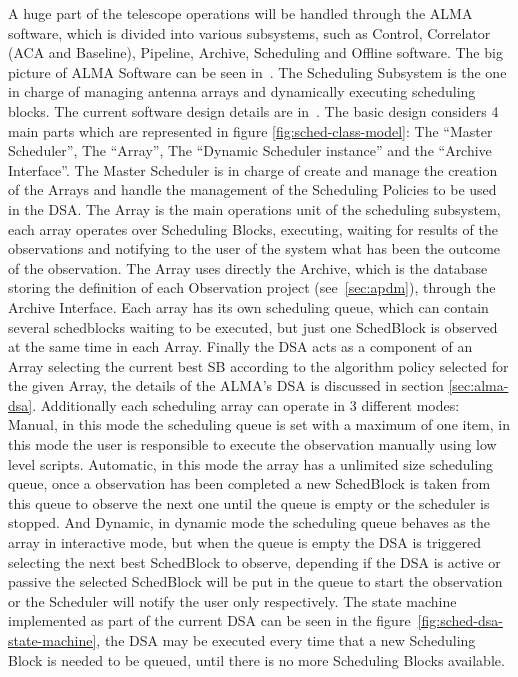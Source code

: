 A huge part of the telescope operations will be handled through the ALMA software, which is divided into various subsystems, such as Control, Correlator (ACA and Baseline), Pipeline, Archive, Scheduling and Offline software. The big picture of ALMA Software can be seen in~\cite{schwarz04}.
The Scheduling Subsystem is the one in charge of managing antenna arrays and dynamically executing scheduling blocks. The current software design details are in~\cite{clarke12}. The basic design considers 4 main parts which are represented in figure \ref{fig:sched-class-model}: The ``Master Scheduler'', The ``Array'', The ``Dynamic Scheduler instance'' and the ``Archive Interface''. The Master Scheduler is in charge of create and manage the creation of the Arrays and handle the management of the Scheduling Policies to be used in the DSA. The Array is the main operations unit of the scheduling subsystem, each array operates over Scheduling Blocks, executing, waiting for results of the observations and notifying to the user of the system what has been the outcome of the observation. The Array uses directly the Archive, which is the database storing the definition of each Observation project (see~\ref{sec:apdm}), through the Archive Interface. Each array has its own scheduling queue, which can contain several schedblocks waiting to be executed, but just one SchedBlock is observed at the same time in each Array. Finally the DSA acts as a component of an Array selecting the current best SB according to the algorithm policy selected for the given Array, the details of the ALMA's DSA is discussed in section \ref{sec:alma-dsa}. Additionally each scheduling array can operate in 3 different modes: Manual, in this mode the scheduling queue is set with a maximum of one item, in this mode the user is responsible to execute the observation manually using low level scripts. Automatic, in this mode the array has a unlimited size scheduling queue, once a observation has been completed a new SchedBlock is taken from this queue to observe the next one until the queue is empty or the scheduler is stopped. And Dynamic, in dynamic mode the scheduling queue behaves as the array in interactive mode, but when the queue is empty the DSA is triggered selecting the next best SchedBlock to observe, depending if the DSA is active or passive the selected SchedBlock will be put in the queue to start the observation or the Scheduler will notify the user only respectively. The state machine implemented as part of the current DSA can be seen in the figure~\ref{fig:sched-dsa-state-machine}, the DSA may be executed every time that a new Scheduling Block is needed to be queued, until there is no more Scheduling Blocks available.

